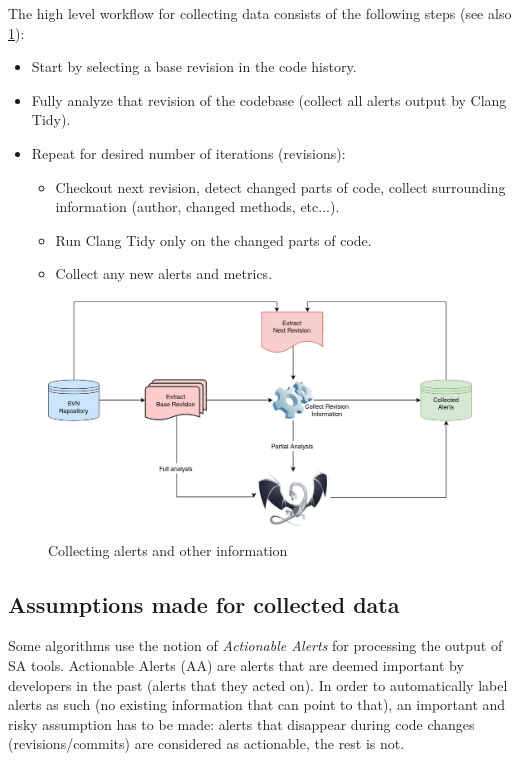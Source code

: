 The high level workflow for collecting data consists of the following steps (see also \cref{data_workflow}):
\begin{itemize}
	\item Start by selecting a base revision in the code history.
	\item Fully analyze that revision of the codebase (collect all alerts output by Clang Tidy).
	\item Repeat for desired number of iterations (revisions):
	\begin{itemize}
		\item Checkout next revision, detect changed parts of code, collect surrounding information (author, changed methods, etc...).
		\item Run Clang Tidy only on the changed parts of code.
		\item Collect any new alerts and metrics.
	\end{itemize} 
\end{itemize}


\begin{figure}[H]
	\centering
	\includegraphics[scale=0.2]{./src/collect_info.png}
	\caption{Collecting alerts and other information}
	\label{data_workflow}
\end{figure}

\subsection{Assumptions made for collected data}
Some algorithms use the notion of \textit{Actionable Alerts} for processing the output of SA tools. Actionable Alerts (AA) are alerts that are deemed important by developers in the past (alerts that they acted on). In order to automatically label alerts as such (no existing information that can point to that), an important and risky assumption has to be made: alerts that disappear during code changes (revisions/commits) are considered as actionable, the rest is not. 

